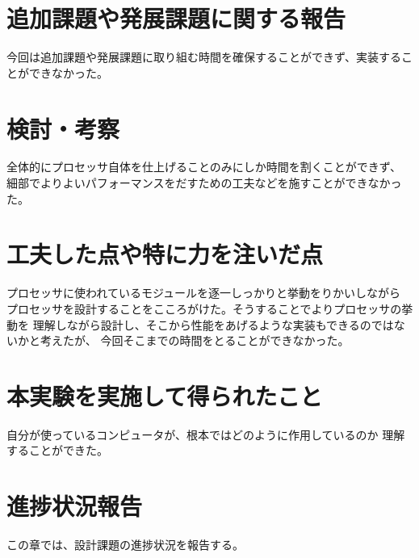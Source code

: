 \documentclass{jarticle}[11pt]
\begin{document}
\section{追加課題や発展課題に関する報告}
\label{sec:追加課題や発展課題に関する報告}


今回は追加課題や発展課題に取り組む時間を確保することができず、実装することができなかった。



\section{検討・考察}
\label{sec:検討・考察}

全体的にプロセッサ自体を仕上げることのみにしか時間を割くことができず、
細部でよりよいパフォーマンスをだすための工夫などを施すことができなかった。




\section{工夫した点や特に力を注いだ点}
\label{sec:工夫した点や特に力を注いだ点}

プロセッサに使われているモジュールを逐一しっかりと挙動をりかいしながら
プロセッサを設計することをこころがけた。そうすることでよりプロセッサの挙動を
理解しながら設計し、そこから性能をあげるような実装もできるのではないかと考えたが、
今回そこまでの時間をとることができなかった。



\section{本実験を実施して得られたこと}
\label{sec:本実験を実施して得られたこと}

自分が使っているコンピュータが、根本ではどのように作用しているのか
理解することができた。



\section{進捗状況報告}
\label{sec:進捗状況報告}

この章では、設計課題の進捗状況を報告する。
\end{document}
